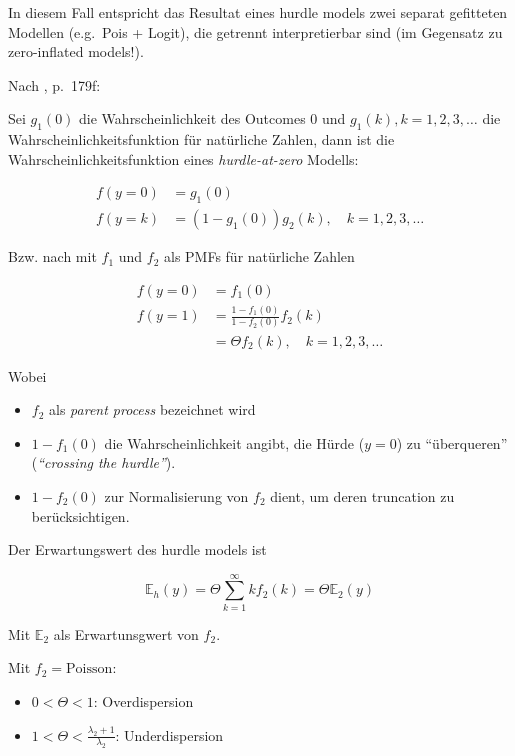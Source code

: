 \documentclass[ngerman,a4paper,]{scrartcl}
\providecommand{\tightlist}{%
  \setlength{\itemsep}{0pt}\setlength{\parskip}{0pt}}
\theoremstyle{definition}
\theoremstyle{definition}
\theoremstyle{definition}
\theoremstyle{remark}
\let\BeginKnitrBlock\begin \let\EndKnitrBlock\end
\begin{document}
In diesem Fall entspricht das Resultat eines hurdle models zwei separat gefitteten Modellen (e.g.~Pois + Logit), die getrennt interpretierbar sind (im Gegensatz zu zero-inflated models!).

\BeginKnitrBlock{definition}[Hurdle Model]
\protect\hypertarget{def:unnamed-chunk-5}{}{\label{def:unnamed-chunk-5} \iffalse (Hurdle Model) \fi{} }Nach \citet{winkelmannEconometricAnalysisCount2010}, p.~179f:

Sei \(g_1(0)\) die Wahrscheinlichkeit des Outcomes \(0\) und \(g_1(k), k = 1, 2, 3, \ldots\) die Wahrscheinlichkeitsfunktion für natürliche Zahlen, dann ist die Wahrscheinlichkeitsfunktion eines \emph{hurdle-at-zero} Modells:

\begin{align*}
f(y = 0) &= g_1(0) \\
f(y = k) &= (1 - g_1(0)) g_2(k), \quad k = 1, 2, 3, \ldots
\end{align*}

Bzw. nach \citet{mullahy1986SpecificationTesting} mit \(f_1\) und \(f_2\) als PMFs für natürliche Zahlen

\begin{align*}
f(y = 0) &= f_1(0) \\
f(y = 1) &= \frac{1 - f_1(0)}{1 - f_2(0)} f_2(k) \\
         &= \Theta f_2(k), \quad k = 1, 2, 3, \ldots 
\end{align*}

Wobei

\begin{itemize}
\tightlist
\item
  \(f_2\) als \emph{parent process} bezeichnet wird
\item
  \(1 - f_1(0)\) die Wahrscheinlichkeit angibt, die Hürde (\(y = 0\)) zu \enquote{überqueren} (\emph{\enquote{crossing the hurdle}}).
\item
  \(1 - f_2(0)\) zur Normalisierung von \(f_2\) dient, um deren truncation zu berücksichtigen.
\end{itemize}

Der Erwartungswert des hurdle models ist

\[
  \mathbb{E}_h(y) = \Theta \sum_{k=1}^\infty k f_2(k) = \Theta \mathbb{E}_2(y)
\]

Mit \(\mathbb{E}_2\) als Erwartunsgwert von \(f_2\).

Mit \(f_2 = \mathrm{Poisson}\):

\begin{itemize}
\tightlist
\item
  \(0 < \Theta < 1\): Overdispersion\\
\item
  \(1 < \Theta < \frac{\lambda_2 + 1}{\lambda_2}\): Underdispersion
\end{itemize}
\EndKnitrBlock{definition}
\end{document}
